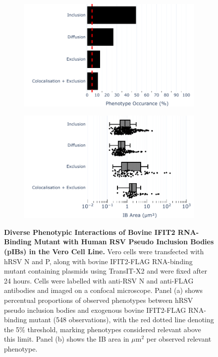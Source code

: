 \begin{figure}
    \begin{subfigure}{0.495\textwidth}
        \caption{}
        \includegraphics[width=1\linewidth]{09. Chapter 4/Figs/01. pIB/03. IFIT2/05. IFIT2-RNA binding mutant/02. pIB/01. bar_bi2f24_hnhp.pdf} 
    \end{subfigure}
    \begin{subfigure}{0.495\textwidth}
        \caption{}
        \includegraphics[width=1\linewidth]{09. Chapter 4/Figs/01. pIB/03. IFIT2/05. IFIT2-RNA binding mutant/02. pIB/02. box_bi2f24_hnhp.pdf}
    \end{subfigure}
    \caption[Diverse Phenotypic Interactions of Bovine IFIT2 RNA-Binding Mutant with Human RSV Pseudo Inclusion Bodies (pIBs) in the Vero Cell Line.]{\textbf{Diverse Phenotypic Interactions of Bovine IFIT2 RNA-Binding Mutant with Human RSV Pseudo Inclusion Bodies (pIBs) in the Vero Cell Line.} Vero cells were transfected with hRSV N and P, along with bovine IFIT2-FLAG RNA-binding mutant containing plasmids using TransIT-X2 and were fixed after 24 hours. Cells were labelled with anti-RSV N and anti-FLAG antibodies and imaged on a confocal microscope. Panel (a) shows percentual proportions of observed phenotypes between hRSV pseudo inclusion bodies and exogenous bovine IFIT2-FLAG RNA-binding mutant (548 observations), with the red dotted line denoting the 5\% threshold, marking phenotypes considered relevant above this limit. Panel (b) shows the IB area in \(\mu \mbox{m}^2\) per observed relevant phenotype.}
    \label{fig:Diverse Phenotypic Interactions of Bovine IFIT2 RNA-Binding Mutant with Human RSV Pseudo Inclusion Bodies (pIBs) in the Vero Cell Line}
\end{figure}

